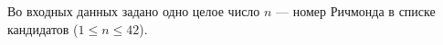 Во входных данных задано одно целое число $n$ --- номер Ричмонда в списке кандидатов ($1 \le n \le 42$).